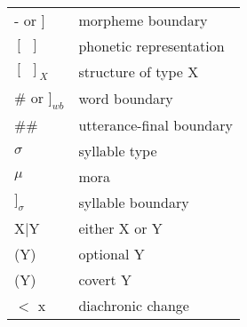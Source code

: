 \begin{tabular}{ll}
-  or $]$& morpheme boundary\\
$[   \ \  ]$ & phonetic representation\\
$[  \ \ ]_{X}$ &   structure of type X\\
\#  or $]_{wb}$ &  word boundary\\
 \#\# &utterance-final boundary\\
 $\sigma$ &  syllable  type\\
 $\mu$ & mora\\ 
$]_{\sigma}$ &  syllable  boundary\\
X|Y & either X or Y\\
(Y) & optional Y\\
(Y) & covert Y\\
 $<$ x & diachronic change\\


\end{tabular}